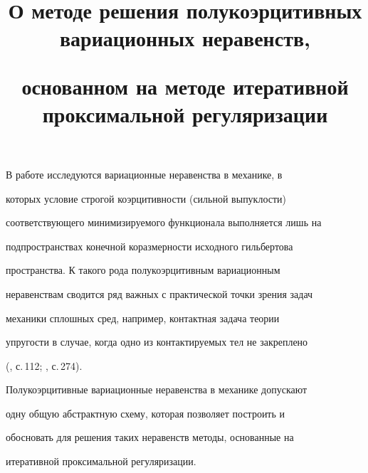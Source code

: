 \title{О методе решения полукоэрцитивных вариационных неравенств,


основанном на методе итеративной проксимальной регуляризации}





\date{}




\pagestyle{plain} %







\maketitle


\label{begin}











В работе исследуются вариационные неравенства в механике, в


которых условие строгой коэрцитивности (сильной выпуклости)


соответствующего минимизируемого функционала выполняется лишь на


подпространствах конечной коразмерности исходного гильбертова


пространства. К такого рода полукоэрцитивным вариационным


неравенствам сводится ряд важных с практической точки зрения задач


механики сплошных сред, например, контактная задача теории


упругости в случае, когда одно из контактируемых тел не закреплено


(\cite{1}, с.\,112; \cite{2}, с.\,274).





Полукоэрцитивные вариационные неравенства в механике допускают


одну общую абстрактную схему, которая позволяет построить и


обосновать для решения таких неравенств методы, основанные на


итеративной проксимальной регуляризации.





